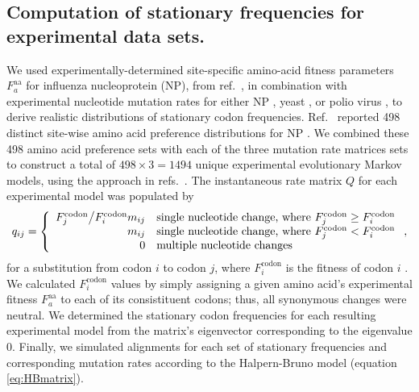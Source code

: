 \documentclass[11pt]{article}
\begin{document}
\subsection*{Computation of stationary frequencies for experimental data sets.}
We used experimentally-determined site-specific amino-acid fitness parameters $F^\text{aa}_a$ for influenza nucleoprotein (NP), from ref.\ \cite{Bloom2014a}, in combination with experimental nucleotide mutation rates for either NP \cite{Bloom2014a}, yeast \cite{Zhu2014}, or polio virus \cite{Acevedo2014}, to derive realistic distributions of stationary codon frequencies. Ref.\ \cite{Bloom2014a} reported 498 distinct site-wise amino acid preference distributions for NP \cite{Bloom2014a}. We combined these 498 amino acid preference sets with each of the three mutation rate matrices sets to construct a total of $498 \times 3 = 1494$ unique experimental evolutionary Markov models, using the approach in refs.\ \cite{Bloom2014a,Bloom2014b}. The instantaneous rate matrix $Q$ for each experimental model was populated by 
\begin{equation}
q_{ij} =  \left\{ 
\begin{array}{rl}
  F^\text{codon}_j \big{/} F^\text{codon}_i m_{ij} &\mbox{single nucleotide change, where $F^\text{codon}_j \geq F^\text{codon}_i$} \\
  m_{ij}                &\mbox{single nucleotide change, where $F^\text{codon}_j < F^\text{codon}_i$}  \\ 
  0                       &\mbox{multiple nucleotide changes} \\        
\end{array} \right.,
\end{equation} for a substitution from codon $i$ to codon $j$, where $F^\text{codon}_i$ is the fitness of codon $i$ \cite{Bloom2014a,Bloom2014b}. We calculated $F^\text{codon}_i$ values by simply assigning a given amino acid's experimental fitness $F^\text{aa}_a$ to each of its consistituent codons; thus, all synonymous changes were neutral. We determined the stationary codon frequencies for each resulting experimental model from the matrix's eigenvector corresponding to the eigenvalue 0. Finally, we simulated alignments for each set of stationary frequencies and corresponding mutation rates according to the Halpern-Bruno model (equation \eqref{eq:HBmatrix}).   

		
\end{document}

